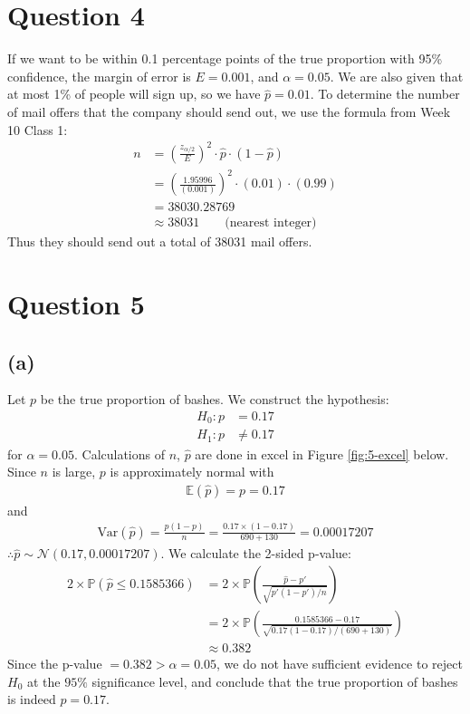 \documentclass[12pt]{article}
\begin{document}
\newpage

\section*{Question 4}
If we want to be within 0.1 percentage points of the true proportion with 95\% confidence, the margin of error is $E = 0.001$, and $\alpha = 0.05$. We are also given that at most 1\% of people will sign up, so we have $\hat{p} = 0.01$. To determine the number of mail offers that the company should send out, we use the formula from Week 10 Class 1: \begin{align*}
    n &= \left( \frac{z_{\alpha / 2}}{E} \right)^{2} \cdot \hat{p} \cdot (1-\hat{p}) \\ 
    &= \left( \frac{1.95996}{(0.001)}\right)^{2} \cdot (0.01) \cdot (0.99) \\ 
    &= 38030.28769 \\ 
    &\approx \boxed{38031} \qquad \text{(nearest integer)}
\end{align*} Thus they should send out a total of 38031 mail offers.

\newpage

\section*{Question 5}

\subsection*{(a)}

Let $p$ be the true proportion of bashes. We construct the hypothesis: \begin{align*}
    H_{0}: p &= 0.17 \\ 
    H_{1}: p &\neq 0.17
\end{align*} for $\alpha = 0.05$. Calculations of $n$, $\hat{p}$ are done in excel in Figure \ref{fig:5-excel} below. Since $n$ is large, $p$ is approximately normal with \begin{align*}
    \mathbb{E}(\hat{p}) = p = 0.17
\end{align*} and \begin{align*}
    \text{Var}(\hat{p}) = \frac{p(1-p)}{n} = \frac{0.17 \times (1-0.17)}{690 + 130} = 0.00017207
\end{align*} $\therefore \hat{p} \sim \mathcal{N}(0.17, 0.00017207)$. We calculate the 2-sided p-value: \begin{align*}
    2 \times \mathbb{P}(\hat{p} \leq 0.1585366) &= 2 \times \mathbb{P}\left(\frac{\hat{p} - p'}{\sqrt{p'(1-p') / n}}\right) \\ 
    &= 2 \times \mathbb{P}\left( \frac{0.1585366 - 0.17}{\sqrt{0.17(1-0.17) / (690+130)}} \right) \\ 
    &\approx \boxed{0.382}
\end{align*} Since the p-value $ = 0.382 > \alpha = 0.05$, we do not have sufficient evidence to reject $H_{0}$ at the $95\%$ significance level, and conclude that the true proportion of bashes is indeed $p = 0.17$. 
\end{document}
